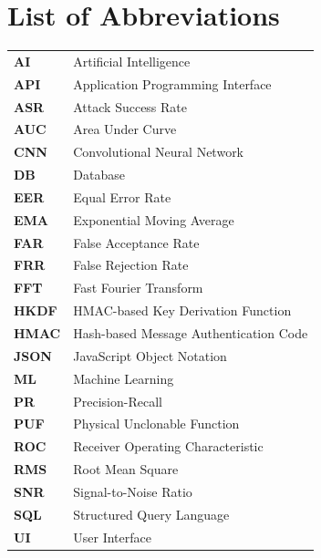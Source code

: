 \documentclass[12pt]{report}
\begin{document}
\chapter*{List of Abbreviations}
\begin{longtable}{p{}p{}}
\textbf{AI} & Artificial Intelligence \\
\textbf{API} & Application Programming Interface \\
\textbf{ASR} & Attack Success Rate \\
\textbf{AUC} & Area Under Curve \\
\textbf{CNN} & Convolutional Neural Network \\
\textbf{DB} & Database \\
\textbf{EER} & Equal Error Rate \\
\textbf{EMA} & Exponential Moving Average \\
\textbf{FAR} & False Acceptance Rate \\
\textbf{FRR} & False Rejection Rate \\
\textbf{FFT} & Fast Fourier Transform \\
\textbf{HKDF} & HMAC-based Key Derivation Function \\
\textbf{HMAC} & Hash-based Message Authentication Code \\
\textbf{JSON} & JavaScript Object Notation \\
\textbf{ML} & Machine Learning \\
\textbf{PR} & Precision-Recall \\
\textbf{PUF} & Physical Unclonable Function \\
\textbf{ROC} & Receiver Operating Characteristic \\
\textbf{RMS} & Root Mean Square \\
\textbf{SNR} & Signal-to-Noise Ratio \\
\textbf{SQL} & Structured Query Language \\
\textbf{UI} & User Interface \\
\end{longtable}

\newpage
\end{document}

